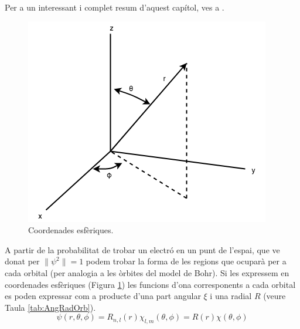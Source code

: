 Per a un interessant i complet resum d'aquest capítol, ves a .
\begin{figure}[h]
\centering
\includegraphics[scale=0.4]{figures/SphericalCoords.png}
\caption{Coordenades esfèriques.}
\label{fig:SphericalCoords}
\end{figure}
A partir de la probabilitat de trobar un electró en un punt de l'espai, que ve donat per $\|\psi^2\|=1$ podem trobar la forma de les regions que ocuparà per a cada orbital (per analogia a les òrbites del model de Bohr). Si les expressem en coordenades esfèriques (Figura \ref{fig:SphericalCoords}) les funcions d'ona corresponents a cada orbital es poden expressar com a producte d'una part angular $\xi$ i una radial $R$ (veure Taula \ref{tab:AngRadOrb}).
\begin{equation}
\psi(r,\theta,\phi)=R_{n,l}(r)\chi_{l,m}(\theta,\phi)=R(r)\chi(\theta,\phi)
\label{Eq:psisplit}
\end{equation}
